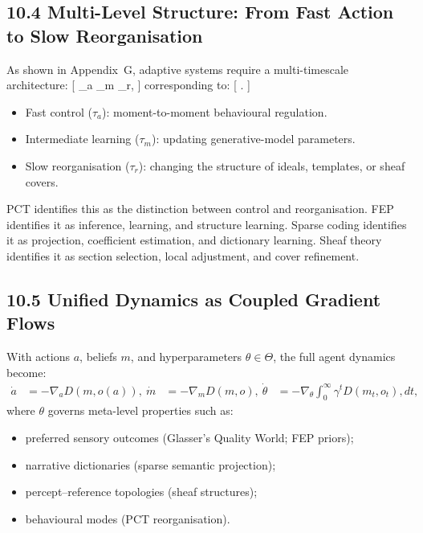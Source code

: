 \documentclass[11pt,a4paper,twoside]{article}
\begin{document}
\subsection{10.4 Multi-Level Structure: From Fast Action to Slow Reorganisation}

As shown in Appendix~G, adaptive systems require a multi-timescale architecture:
[
\tau_a \ll \tau_m \ll \tau_r,
]
corresponding to:
[
 \ll {} \ll {}.
]

\begin{itemize}
\item Fast control ($\tau_a$): moment-to-moment behavioural regulation.
\item Intermediate learning ($\tau_m$): updating generative-model parameters.
\item Slow reorganisation ($\tau_r$): changing the structure of ideals, templates, or sheaf covers.
\end{itemize}

PCT identifies this as the distinction between control and reorganisation. FEP identifies it as inference, learning, and structure learning. Sparse coding identifies it as projection, coefficient estimation, and dictionary learning. Sheaf theory identifies it as section selection, local adjustment, and cover refinement.

\subsection{10.5 Unified Dynamics as Coupled Gradient Flows}

With actions $a$, beliefs $m$, and hyperparameters $\theta\in\Theta$, the full agent dynamics become:
\begin{align}
\dot{a} &= - \nabla_a D(m,o(a)), \
\dot{m} &= - \nabla_m D(m,o), \
\dot{\theta} &= - \nabla_\theta \int_0^\infty \gamma^t D(m_t, o_t), dt,
\end{align}
where $\theta$ governs meta-level properties such as:
\begin{itemize}
\item preferred sensory outcomes (Glasser’s Quality World; FEP priors);
\item narrative dictionaries (sparse semantic projection);
\item percept--reference topologies (sheaf structures);
\item behavioural modes (PCT reorganisation).
\end{itemize}
\end{document}
